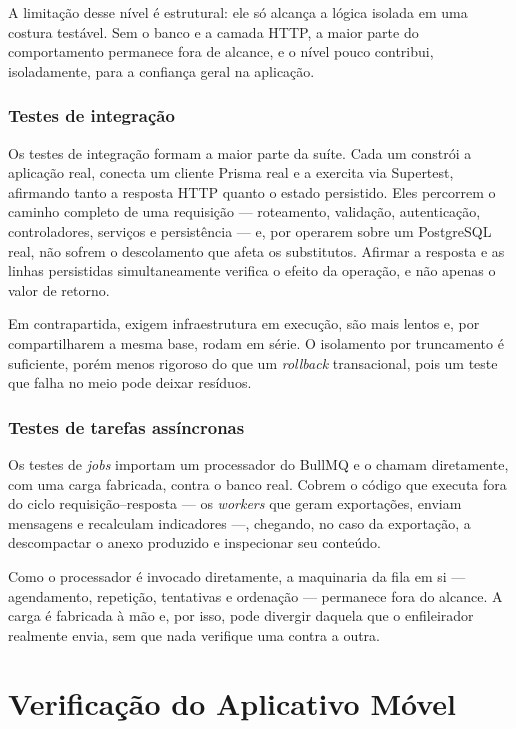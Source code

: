 A limitação desse nível é estrutural: ele só alcança a lógica isolada em uma
costura testável. Sem o banco e a camada HTTP, a maior parte do comportamento
permanece fora de alcance, e o nível pouco contribui, isoladamente, para a
confiança geral na aplicação.

\subsubsection{Testes de integração}

Os testes de integração formam a maior parte da suíte. Cada um constrói a
aplicação real, conecta um cliente Prisma real e a exercita via Supertest,
afirmando tanto a resposta HTTP quanto o estado persistido. Eles percorrem o
caminho completo de uma requisição --- roteamento, validação, autenticação,
controladores, serviços e persistência --- e, por operarem sobre um PostgreSQL
real, não sofrem o descolamento que afeta os substitutos. Afirmar a resposta e
as linhas persistidas simultaneamente verifica o efeito da operação, e não
apenas o valor de retorno.

Em contrapartida, exigem infraestrutura em execução, são mais lentos e, por
compartilharem a mesma base, rodam em série. O isolamento por truncamento é
suficiente, porém menos rigoroso do que um \textit{rollback} transacional, pois
um teste que falha no meio pode deixar resíduos.

\subsubsection{Testes de tarefas assíncronas}

Os testes de \textit{jobs} importam um processador do BullMQ e o chamam
diretamente, com uma carga fabricada, contra o banco real. Cobrem o código que
executa fora do ciclo requisição--resposta --- os \textit{workers} que geram
exportações, enviam mensagens e recalculam indicadores ---, chegando, no caso
da exportação, a descompactar o anexo produzido e inspecionar seu conteúdo.

Como o processador é invocado diretamente, a maquinaria da fila em si ---
agendamento, repetição, tentativas e ordenação --- permanece fora do alcance. A
carga é fabricada à mão e, por isso, pode divergir daquela que o enfileirador
realmente envia, sem que nada verifique uma contra a outra.

\section{Verificação do Aplicativo Móvel}\label{sec:test-mobile}

